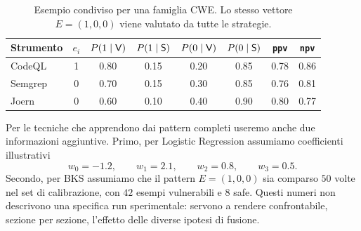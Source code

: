 \begin{table}[h]
\centering
\small
\begin{tabular}{lccccccc}
\toprule
Strumento & $e_i$ & $P(1\mid\mathsf{V})$ & $P(1\mid\mathsf{S})$ & $P(0\mid\mathsf{V})$ & $P(0\mid\mathsf{S})$ & \texttt{ppv} & \texttt{npv}\\
\midrule
CodeQL  & 1 & 0.80 & 0.15 & 0.20 & 0.85 & 0.78 & 0.86\\
Semgrep & 0 & 0.70 & 0.15 & 0.30 & 0.85 & 0.76 & 0.81\\
Joern   & 0 & 0.60 & 0.10 & 0.40 & 0.90 & 0.80 & 0.77\\
\bottomrule
\end{tabular}
\caption{Esempio condiviso per una famiglia CWE. Lo stesso vettore $E=(1,0,0)$ viene valutato da tutte le strategie.}
\label{tab:shared_example}
\end{table}

Per le tecniche che apprendono dai pattern completi useremo anche due informazioni aggiuntive. Primo, per Logistic Regression assumiamo coefficienti illustrativi
\begin{equation}
w_0=-1.2,\qquad w_1=2.1,\qquad w_2=0.8,\qquad w_3=0.5.
\end{equation}
Secondo, per BKS assumiamo che il pattern $E=(1,0,0)$ sia comparso $50$ volte nel set di calibrazione, con $42$ esempi vulnerabili e $8$ safe. Questi numeri non descrivono una specifica run sperimentale: servono a rendere confrontabile, sezione per sezione, l'effetto delle diverse ipotesi di fusione.
